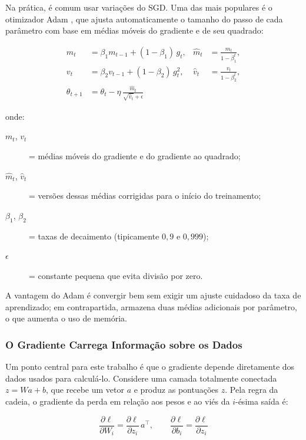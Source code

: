 Na prática, é comum usar variações do SGD. Uma das mais populares é o otimizador Adam \cite{Kingma2015}, que ajusta automaticamente o tamanho do passo de cada parâmetro com base em médias móveis do gradiente e de seu quadrado:

\begin{equation} \label{eq:adam}
\begin{aligned}
m_t &= \beta_1 m_{t-1} + (1-\beta_1)\, g_t, & \hat{m}_t &= \frac{m_t}{1-\beta_1^{t}}, \\
v_t &= \beta_2 v_{t-1} + (1-\beta_2)\, g_t^{2}, & \hat{v}_t &= \frac{v_t}{1-\beta_2^{t}}, \\
\theta_{t+1} &= \theta_t - \eta \, \frac{\hat{m}_t}{\sqrt{\hat{v}_t} + \epsilon}
\end{aligned}
\end{equation}

\noindent onde:
\begin{description}
  \item[$m_t$, $v_t$] = médias móveis do gradiente e do gradiente ao quadrado;
  \item[$\hat{m}_t$, $\hat{v}_t$] = versões dessas médias corrigidas para o início do treinamento;
  \item[$\beta_1$, $\beta_2$] = taxas de decaimento (tipicamente $0{,}9$ e $0{,}999$);
  \item[$\epsilon$] = constante pequena que evita divisão por zero.
\end{description}

A vantagem do Adam é convergir bem sem exigir um ajuste cuidadoso da taxa de aprendizado; em contrapartida, armazena duas médias adicionais por parâmetro, o que aumenta o uso de memória.

\subsubsection{O Gradiente Carrega Informação sobre os Dados}

Um ponto central para este trabalho é que o gradiente depende diretamente dos dados usados para calculá-lo. Considere uma camada totalmente conectada $z = Wa + b$, que recebe um vetor $a$ e produz as pontuações $z$. Pela regra da cadeia, o gradiente da perda em relação aos pesos e ao viés da $i$-ésima saída é:

\begin{equation} \label{eq:grad-linear}
\frac{\partial \ell}{\partial W_{i}} = \frac{\partial \ell}{\partial z_i} \, a^{\top}, \qquad \frac{\partial \ell}{\partial b_i} = \frac{\partial \ell}{\partial z_i}
\end{equation}

